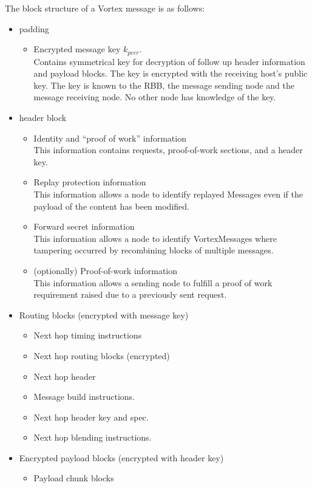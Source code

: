 \documentclass[10pt,journal,compsoc]{IEEEtran}
\begin{document}
The block structure of a Vortex message is as follows:
\begin{itemize}
	\item padding
	\begin{itemize}
		\item Encrypted message key $k_{peer}$.\\
	          Contains symmetrical key for decryption of follow up header information and payload blocks. The key is encrypted with the receiving host's public key. The key is known to the RBB, the message sending node and the message receiving node. No other node has knowledge of the key.
	\end{itemize}      
	\item header block
	\begin{itemize}
		\item Identity and ``proof of work'' information\\
		      This information contains requests, proof-of-work sections, and a header key.
		\item Replay protection information\\
		      This information allows a node to identify replayed Messages even if the payload of the content has been modified.
		\item Forward secret information\\
		      This information allows a node to identify VortexMessages where tampering occurred by recombining blocks of multiple messages.      
		\item (optionally) Proof-of-work information\\
              This information allows a sending node to fulfill a proof of work requirement raised due to a previously sent request.      
	\end{itemize}
		\item Routing blocks (encrypted with message key)
	\begin{itemize}
		\item Next hop timing instructions
		\item Next hop routing blocks (encrypted)
		\item Next hop header
		\item Message build instructions.
		\item Next hop header key and spec.
		\item Next hop blending instructions.
	\end{itemize}
	\item Encrypted payload blocks (encrypted with header key)
	\begin{itemize}
		\item Payload chunk blocks
	\end{itemize}
\end{itemize}
\end{document}
